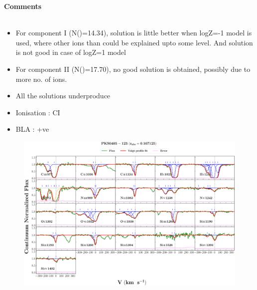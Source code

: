 \documentclass[12pt]{report}
\newcommand\ion[2]{\text{#1\,\textsc{\lowercase{#2}}}}
\begin{document}
\newpage

\textbf{Comments}
\\\\
\begin{itemize}
    \item For component I (N(\ion{H}{i})=14.34), solution is little better when logZ=-1 model is used, where other ions than \ion{O}{vi} could be explained upto some level. And solution is not good in case of logZ=1 model
    \item For component II (N(\ion{H}{i})=17.70), no good solution is obtained, possibly due to more no. of ions. 
    \item All the solutions underproduce \ion{O}{vi}
    \item Ionisation : CI
    \item BLA : +ve
\end{itemize}





\newpage

\begin{landscape}

\begin{figure}
    \centering
    \vspace{-20mm}
    \hspace*{-35mm}
    \includegraphics[width=1.25\linewidth]{System-Plots/PKS0405-123_z=0.167125_sys_plot.png}
\end{figure}

\end{landscape}
\end{document}
